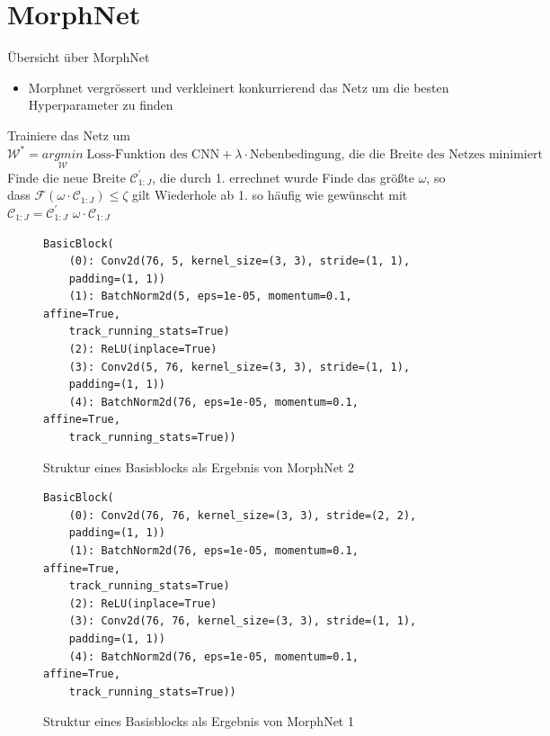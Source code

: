 \documentclass[10pt]{beamer}
\begin{document}
\section{MorphNet}


\begin{frame}{Übersicht über MorphNet}
\begin{itemize}
 \item Morphnet vergrössert und verkleinert konkurrierend das Netz um die besten Hyperparameter zu finden
\end{itemize}
\end{frame}

\begin{frame}
\begin{algorithm}[H]
\begin{algorithmic}[1]
\STATE Trainiere das Netz um $\mathcal{W}^{\ast}=\underset{\mathcal{W}}{arg min}\; \text{Loss-Funktion des CNN} + \lambda \cdot \text{Nebenbedingung, die die Breite des Netzes minimiert}$
\STATE Finde die neue Breite $\mathcal{C}_{1:J}^{\prime}$, die durch 1. errechnet wurde
\STATE Finde das größte $\omega$, so dass $\mathcal{F}(\omega \cdot \mathcal{C}_{1:J})\leq \zeta$ gilt
\STATE Wiederhole ab 1. so häufig wie gewünscht mit $\mathcal{C}_{1:J} = \mathcal{C}_{1:J}^{\prime}$
\ENSURE $\omega \cdot \mathcal{C}_{1:J}$
\end{algorithmic}
\end{algorithm}
\end{frame}

\begin{frame}[fragile]
\begin{figure}
\begin{verbatim}   
BasicBlock(
    (0): Conv2d(76, 5, kernel_size=(3, 3), stride=(1, 1), 
    padding=(1, 1))
    (1): BatchNorm2d(5, eps=1e-05, momentum=0.1, affine=True, 
    track_running_stats=True)
    (2): ReLU(inplace=True)
    (3): Conv2d(5, 76, kernel_size=(3, 3), stride=(1, 1), 
    padding=(1, 1))
    (4): BatchNorm2d(76, eps=1e-05, momentum=0.1, affine=True, 
    track_running_stats=True))
\end{verbatim}
\caption{Struktur eines Basisblocks als Ergebnis von MorphNet 2}
\label{abb:verb2}
\end{figure}

\end{frame}


\begin{frame}[fragile]
 \begin{figure}
\begin{verbatim}
BasicBlock(
    (0): Conv2d(76, 76, kernel_size=(3, 3), stride=(2, 2),
    padding=(1, 1))
    (1): BatchNorm2d(76, eps=1e-05, momentum=0.1, affine=True,
    track_running_stats=True)
    (2): ReLU(inplace=True)
    (3): Conv2d(76, 76, kernel_size=(3, 3), stride=(1, 1), 
    padding=(1, 1))
    (4): BatchNorm2d(76, eps=1e-05, momentum=0.1, affine=True, 
    track_running_stats=True))
\end{verbatim}
\caption{Struktur eines Basisblocks als Ergebnis von MorphNet 1}
\label{abb:verb1}
\end{figure}
\end{frame}
\end{document}
